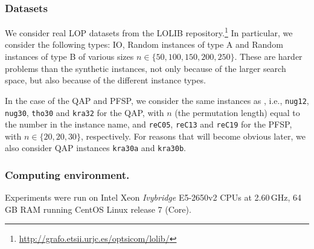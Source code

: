 \documentclass[sigconf,dvipsnames]{acmart}
\begin{document}
\subsubsection{Datasets}
%
We consider real LOP datasets from the LOLIB
repository.\footnote{\url{http://grafo.etsii.urjc.es/optsicom/lolib/}} In
particular, we consider the following types: IO, Random instances of type A and
Random instances of type B of various sizes $n \in \{50, 100, 150, 200,
250\}$. These are harder problems than the synthetic instances, not only
because of the larger search space, but also because of the different instance
types.

In the case of the QAP and PFSP, we consider the same instances as
\citet{ZaeStoFriFisNauBar2014,ZaeStoBar2014:ppsn}, i.e., \texttt{nug12},
\texttt{nug30}, \texttt{tho30} and \texttt{kra32} for the QAP, with $n$ (the
permutation length) equal to the number in the instance name, and
\texttt{reC05}, \texttt{reC13} and \texttt{reC19} for the PFSP, with
$n \in \{20, 20, 30\}$, respectively. For reasons that will become obvious
later, we also consider QAP instances \texttt{kra30a} and \texttt{kra30b}.

\subsubsection{Computing environment.}
Experiments were run on Intel Xeon \emph{Ivybridge} E5-2650v2 CPUs at
2.60\,GHz, 64\,GB RAM running CentOS Linux release 7 (Core).
\end{document}
